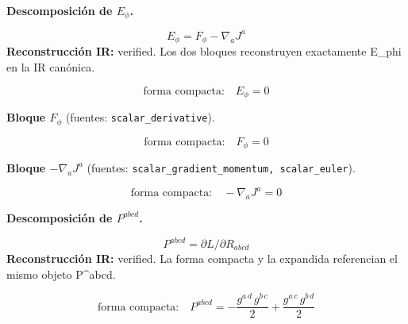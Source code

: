 \documentclass[11pt]{article}
\begin{document}
\par\medskip\noindent\textbf{Descomposición de $ E_{\phi} $.}\par
\begin{dmath*}[breakdepth={5}]
E_{\phi}=F_{\phi}-\nabla_aJ^a
\end{dmath*}
\textbf{Reconstrucción IR:} verified. Los dos bloques reconstruyen exactamente E\_phi en la IR canónica.\par
\begin{dmath*}[breakdepth={5}]
\text{forma compacta:}\quad E_{\phi} = 0
\end{dmath*}
\par\smallskip\noindent\textbf{Bloque $ F_{\phi} $} (fuentes: \texttt{scalar\_derivative}).\par
\begin{dmath*}[breakdepth={5}]
\text{forma compacta:}\quad F_{\phi} = 0
\end{dmath*}
\par\smallskip\noindent\textbf{Bloque $ -\nabla_a J^a $} (fuentes: \texttt{scalar\_gradient\_momentum, scalar\_euler}).\par
\begin{dmath*}[breakdepth={5}]
\text{forma compacta:}\quad -\nabla_a J^a = 0
\end{dmath*}
\par\medskip\noindent\textbf{Descomposición de $ P^{abcd} $.}\par
\begin{dmath*}[breakdepth={5}]
P^{abcd}=\partial L/\partial R_{abcd}
\end{dmath*}
\textbf{Reconstrucción IR:} verified. La forma compacta y la expandida referencian el mismo objeto P^{abcd}.\par
\begin{dmath*}[breakdepth={5}]
\text{forma compacta:}\quad P^{abcd} = -\frac{g{}^{a\,d}\,g{}^{b\,c}}{2} + \frac{g{}^{a\,c}\,g{}^{b\,d}}{2}
\end{dmath*}
\end{document}
